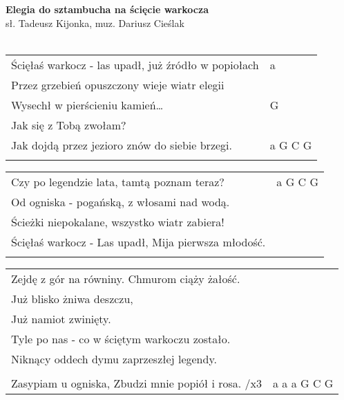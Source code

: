 \documentclass[a5paper]{article}
\begin{document}


\noindent
\fontsize{12pt}{15pt}\selectfont
\textbf{Elegia do sztambucha na ścięcie warkocza} \\
\fontsize{8pt}{10pt}\selectfont
sł. Tadeusz Kijonka, muz. Dariusz Cieślak \\ \\
\fontsize{10pt}{12pt}\selectfont
{}
\begin{tabular}{@{}p{9.00cm}p{3cm}@{}}
\noindent
Ścięłaś warkocz - las upadł, już źródło w popiołach & a \\
Przez grzebień opuszczony wieje wiatr elegii \\
Wysechł w pierścieniu kamień… & G \\
Jak się z Tobą zwołam? \\
Jak dojdą przez jezioro znów do siebie brzegi. & a G C G \\\\
\end{tabular}

\noindent
\begin{tabular}{@{}p{8.00cm}p{3cm}@{}} 
Czy po legendzie lata, tamtą poznam teraz? & a G C G \\
Od ogniska - pogańską, z włosami nad wodą. \\
Ścieżki niepokalane, wszystko wiatr zabiera! \\
Ścięłaś warkocz - Las upadł, Mija pierwsza młodość. \\ \\
\end{tabular}

\noindent
\begin{tabular}{@{}p{8.00cm}p{3cm}@{}}
Zejdę z gór na równiny. Chmurom ciąży żałość. \\
Już blisko żniwa deszczu, \\
Już namiot zwinięty. \\
Tyle po nas - co w ściętym warkoczu zostało. \\
Niknący oddech dymu zaprzeszłej legendy. \\\\
 
Zasypiam u ogniska, Zbudzi mnie popiół i rosa. /x3 & a a a G C G 
\end{tabular}
\end{document}
